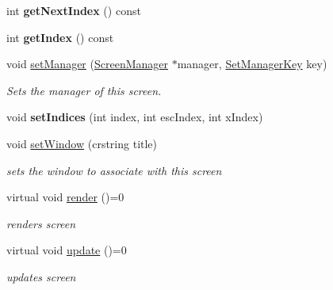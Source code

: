 \begin{DoxyCompactItemize}
int {\bfseries get\+Next\+Index} () const
\item 
\mbox{\label{classnta_1_1Screen_ae149bdd787f8f41b45c667faef971326}} 
int {\bfseries get\+Index} () const
\item 
\mbox{\label{classnta_1_1Screen_a9c9329a6700fbed8ab6513d471835bfa}} 
void \hyperlink{classnta_1_1Screen_a9c9329a6700fbed8ab6513d471835bfa}{set\+Manager} (\hyperlink{classnta_1_1ScreenManager}{Screen\+Manager} $\ast$manager, \hyperlink{classnta_1_1SetManagerKey}{Set\+Manager\+Key} key)
\begin{DoxyCompactList}\small\item\em Sets the manager of this screen. \end{DoxyCompactList}\item 
\mbox{\label{classnta_1_1Screen_a06a0cb178a3bedde883e7a9b5c825a3d}} 
void {\bfseries set\+Indices} (int index, int esc\+Index, int x\+Index)
\item 
\mbox{\label{classnta_1_1Screen_a3c74cd84437e8897850ce4bae98bc8b2}} 
void \hyperlink{classnta_1_1Screen_a3c74cd84437e8897850ce4bae98bc8b2}{set\+Window} (crstring title)
\begin{DoxyCompactList}\small\item\em sets the window to associate with this screen \end{DoxyCompactList}\item 
\mbox{\label{classnta_1_1Screen_a323ff61ac31f55bd39fa818ccd8200fb}} 
virtual void \hyperlink{classnta_1_1Screen_a323ff61ac31f55bd39fa818ccd8200fb}{render} ()=0
\begin{DoxyCompactList}\small\item\em renders screen \end{DoxyCompactList}\item 
\mbox{\label{classnta_1_1Screen_a6892f9b74b033d8bd5f4e9f190d49efa}} 
virtual void \hyperlink{classnta_1_1Screen_a6892f9b74b033d8bd5f4e9f190d49efa}{update} ()=0
\begin{DoxyCompactList}\small\item\em updates screen \end{DoxyCompactList}\item 

\end{DoxyCompactItemize}
